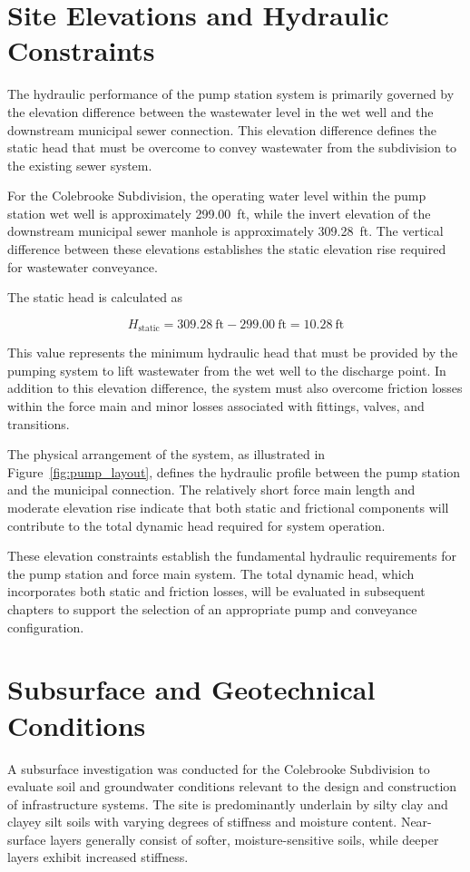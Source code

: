 \section{Site Elevations and Hydraulic Constraints}

The hydraulic performance of the pump station system is primarily governed by the elevation difference between the wastewater level in the wet well and the downstream municipal sewer connection. This elevation difference defines the static head that must be overcome to convey wastewater from the subdivision to the existing sewer system.

For the Colebrooke Subdivision, the operating water level within the pump station wet well is approximately 299.00~ft, while the invert elevation of the downstream municipal sewer manhole is approximately 309.28~ft. The vertical difference between these elevations establishes the static elevation rise required for wastewater conveyance.

The static head is calculated as

\[
H_{\text{static}} = 309.28\ \text{ft} - 299.00\ \text{ft} = 10.28\ \text{ft}
\]

This value represents the minimum hydraulic head that must be provided by the pumping system to lift wastewater from the wet well to the discharge point. In addition to this elevation difference, the system must also overcome friction losses within the force main and minor losses associated with fittings, valves, and transitions.

The physical arrangement of the system, as illustrated in Figure~\ref{fig:pump_layout}, defines the hydraulic profile between the pump station and the municipal connection. The relatively short force main length and moderate elevation rise indicate that both static and frictional components will contribute to the total dynamic head required for system operation.

These elevation constraints establish the fundamental hydraulic requirements for the pump station and force main system. The total dynamic head, which incorporates both static and friction losses, will be evaluated in subsequent chapters to support the selection of an appropriate pump and conveyance configuration.


\section{Subsurface and Geotechnical Conditions}

A subsurface investigation was conducted for the Colebrooke Subdivision to evaluate soil and groundwater conditions relevant to the design and construction of infrastructure systems. The site is predominantly underlain by silty clay and clayey silt soils with varying degrees of stiffness and moisture content. Near-surface layers generally consist of softer, moisture-sensitive soils, while deeper layers exhibit increased stiffness.

